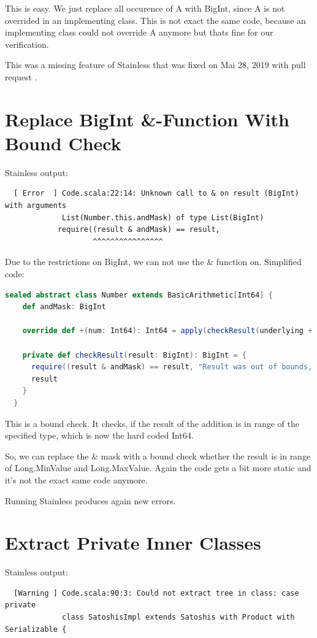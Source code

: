 This is easy.
We just replace all occurence of A with BigInt, since A is not overrided in an implementing class.
This is not exact the same code, because an implementing class could not override A anymore but thats fine for our verification.

This was a missing feature of Stainless that was fixed on Mai 28, 2019 with pull request .


\section{Replace BigInt \&-Function With Bound Check}
\label{sec:bound_check}

Stainless output:
{\footnotesize\begin{verbatim}
  [ Error  ] Code.scala:22:14: Unknown call to & on result (BigInt) with arguments
             List(Number.this.andMask) of type List(BigInt)
            require((result & andMask) == result,
                    ^^^^^^^^^^^^^^^^
\end{verbatim}}

Due to the restrictions on BigInt, we can not use the \& function on.
Simplified code:
\begin{lstlisting}[language=scala]
  sealed abstract class Number extends BasicArithmetic[Int64] {
    def andMask: BigInt

    override def +(num: Int64): Int64 = apply(checkResult(underlying + num.underlying))

    private def checkResult(result: BigInt): BigInt = {
      require((result & andMask) == result, "Result was out of bounds, got: " + result)
      result
    }
  }
\end{lstlisting}

This is a bound check.
It checks, if the result of the addition is in range of the specified type, which is now the hard coded Int64.

So, we can replace the \& mask with a bound check whether the result is in range of Long.MinValue and Long.MaxValue.
Again the code gets a bit more static and it's not the exact same code anymore.

Running Stainless produces again new errors.


\section{Extract Private Inner Classes}

Stainless output:
{\footnotesize\begin{verbatim}
  [Warning ] Code.scala:90:3: Could not extract tree in class: case private
             class SatoshisImpl extends Satoshis with Product with Serializable {
\end{verbatim}}

